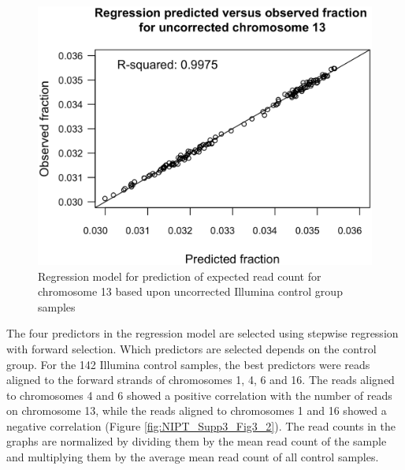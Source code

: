 \begin{figure}[h]
	\includegraphics[width=0.8\linewidth]{img/NIPT_Supp3_Fig3_1}
	\caption[Example of regression model chromosome 13]{Regression model for prediction of expected read count for chromosome 13 based upon uncorrected Illumina control group samples}
	\label{fig:NIPT_Supp3_Fig3_1}
\end{figure}

The four predictors in the regression model are selected using stepwise regression with forward selection. 
Which predictors are selected depends on the control group. For the 142 Illumina control samples, the best predictors were reads aligned to the forward strands of chromosomes 1, 4, 6 and 16. 
The reads aligned to chromosomes 4 and 6 showed a positive correlation with the number of reads on chromosome 13, while the reads aligned to chromosomes 1 and 16 showed a negative correlation (Figure \ref{fig:NIPT_Supp3_Fig3_2}).
The read counts in the graphs are normalized by dividing them by the mean read count of the sample and multiplying them by the average mean read count of all control samples.

